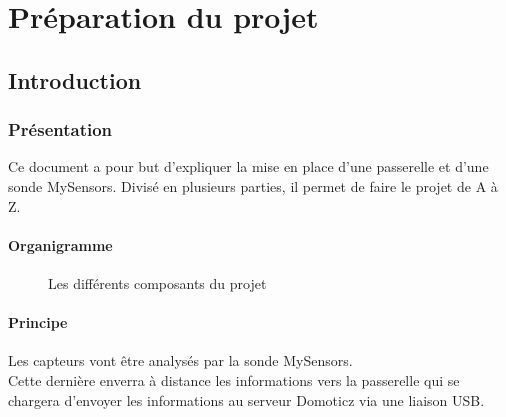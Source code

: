 \part{Préparation du projet}

\chapter{Introduction}

\section{Présentation}

Ce document a pour but d'expliquer la mise en place d'une passerelle et d'une sonde MySensors.
Divisé en plusieurs parties, il permet de faire le projet de A à Z.


\subsection{Organigramme}

\begin{figure}[h]
  \centering
{} 
\caption{Les différents composants du projet}
\end{figure}

  \subsection{Principe}

  Les capteurs vont être analysés par la sonde MySensors.\\
  Cette dernière enverra à distance les informations vers la passerelle qui se chargera d'envoyer les informations au serveur Domoticz via une liaison USB.\\


